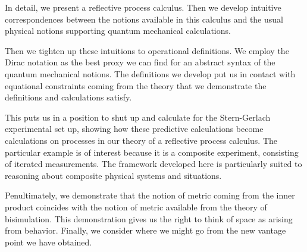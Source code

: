 In detail, we present a reflective process calculus. Then we develop
intuitive correspondences between the notions available in this
calculus and the usual physical notions supporting quantum mechanical
calculations. 

\begin{table}[htp]
  \caption{QM - process calculi correspondences}
\end{table}

Then we tighten up these intuitions to operational definitions. We
employ the Dirac notation as the best proxy we can find for an
abstract syntax of the quantum mechanical notions. The definitions we
develop put us in contact with equational constraints coming from the
theory that we demonstrate the definitions and calculations satisfy.

This puts us in a position to shut up and calculate for the
Stern-Gerlach experimental set up, showing how these predictive
calculations become calculations on processes in our theory of a
reflective process calculus. The particular example is of interest
because it is a composite experiment, consisting of iterated
measurements. The framework developed here is particularly suited to
reasoning about composite physical systems and situations.

Penultimately, we demonstrate that the notion of metric coming from
the inner product coincides with the notion of metric available from
the theory of bisimulation. This demonstration gives us the right to
think of space as arising from behavior. Finally, we consider where we
might go from the new vantage point we have obtained.

